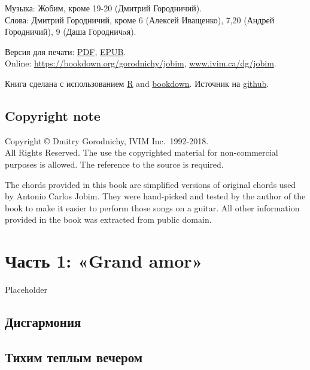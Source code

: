 \documentclass[
]{article}
\begin{document}
Музыка: Жобим, кроме 19-20 (Дмитрий Городничий).\\
Слова: Дмитрий Городничий, кроме 6 (Алексей Иващенко), 7,20 (Андрей Городничий), 9 (Даша Городничaя).

Версия для печати: \href{Shri-Jobim.pdf}{PDF}, \href{Shri-Jobim.epub}{EPUB}.\\
Online: \url{https://bookdown.org/gorodnichy/jobim}, \href{http://www.ivim.ca/dg/jobim}{www.ivim.ca/dg/jobim}.

Книга сделана с использованием \href{https://www.rstudio.com/}{R} and \href{https://bookdown.org/}{bookdown}. Источник на \href{https://github.com/gorodnichy/Shri-Jobim}{github}.

\hypertarget{copyright-note}{%
\subsection*{Copyright note}\label{copyright-note}}

Copyright © Dmitry Gorodnichy, IVIM Inc.~1992-2018.\\
All Rights Reserved. The use the copyrighted material for non-commercial purposes is allowed. The reference to the source is required.

The chords provided in this book are simplified versions of original chords used by Antonio Carlos Jobim. They were hand-picked and tested by the author of the book to make it easier to perform those songs on a guitar. All other information provided in the book was extracted from public domain.

\hypertarget{ux447ux430ux441ux442ux44c-1-grand-amor}{%
\section*{Часть 1: «Grand amor»}\label{ux447ux430ux441ux442ux44c-1-grand-amor}}

Placeholder

\hypertarget{ux434ux438ux441ux433ux430ux440ux43cux43eux43dux438ux44f}{%
\subsection*{Дисгармония}\label{ux434ux438ux441ux433ux430ux440ux43cux43eux43dux438ux44f}}

\hypertarget{ux442ux438ux445ux438ux43c-ux442ux435ux43fux43bux44bux43c-ux432ux435ux447ux435ux440ux43eux43c}{%
\subsection*{Тихим теплым вечером}\label{ux442ux438ux445ux438ux43c-ux442ux435ux43fux43bux44bux43c-ux432ux435ux447ux435ux440ux43eux43c}}
\end{document}
